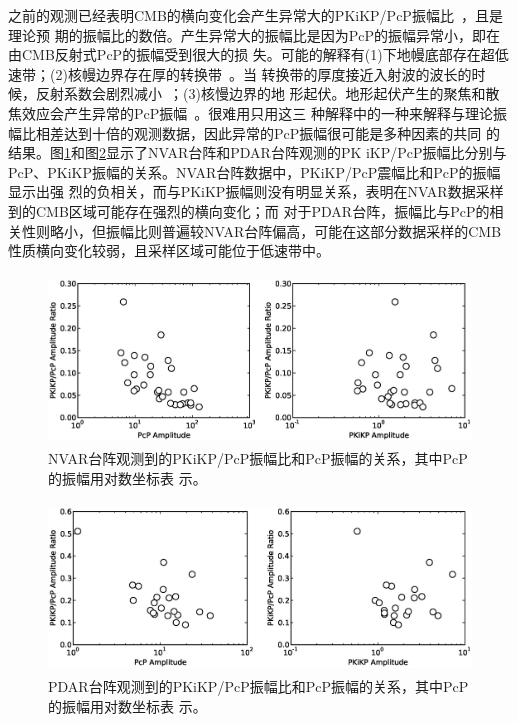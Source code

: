 之前的观测已经表明CMB的横向变化会产生异常大的PKiKP/PcP振幅比~\citep{Koper2004a}，且是理论预
期的振幅比的数倍。产生异常大的振幅比是因为PcP的振幅异常小，即在由CMB反射式PcP的振幅受到很大的损
失。可能的解释有(1)下地幔底部存在超低速带；(2)核幔边界存在厚的转换带~\citep{Garnero2000}。当
转换带的厚度接近入射波的波长的时候，反射系数会剧烈减小~\citep{richards1972}；(3)核慢边界的地
形起伏。地形起伏产生的聚焦和散焦效应会产生异常的PcP振幅~\citep{Neuberg1991}。很难用只用这三
种解释中的一种来解释与理论振幅比相差达到十倍的观测数据，因此异常的PcP振幅很可能是多种因素的共同
的结果。图\ref{nvar_ratio_cor}和图\ref{pdar_ratio_cor}显示了NVAR台阵和PDAR台阵观测的PK
iKP/PcP振幅比分别与PcP、PKiKP振幅的关系。NVAR台阵数据中，PKiKP/PcP震幅比和PcP的振幅显示出强
烈的负相关，而与PKiKP振幅则没有明显关系，表明在NVAR数据采样到的CMB区域可能存在强烈的横向变化；而
对于PDAR台阵，振幅比与PcP的相关性则略小，但振幅比则普遍较NVAR台阵偏高，可能在这部分数据采样的CMB
性质横向变化较弱，且采样区域可能位于低速带中。

\begin{figure}[!ht]
	\centering
	\includegraphics[width=12cm,height=4.5cm]{fig/chap4/nvar_ratio_cor.eps}
	\caption{NVAR台阵观测到的PKiKP/PcP振幅比和PcP振幅的关系，其中PcP的振幅用对数坐标表%
示。}
	\label{nvar_ratio_cor}
\end{figure}

\begin{figure}[!ht]
	\centering
	\includegraphics[width=12cm,height=4.5cm]{fig/chap4/pdar_ratio_cor.eps}
	\caption{PDAR台阵观测到的PKiKP/PcP振幅比和PcP振幅的关系，其中PcP的振幅用对数坐标表%
示。}
	\label{pdar_ratio_cor}
\end{figure}

